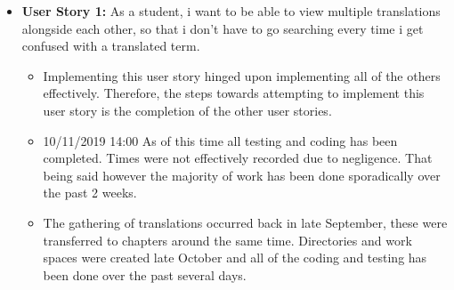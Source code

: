 \documentclass{article}
\begin{document}
\begin{itemize}
\item{\textbf{User Story 1:} As a student, i want to be able to view multiple  translations alongside each other, so that i don’t have to go searching every time i get confused with a translated term.}
\begin{itemize}
\item{Implementing this user story hinged upon implementing all of the others effectively. Therefore, the steps towards attempting to implement this user story is the completion of the other user stories.} 
\item{10/11/2019 14:00 As of this time all testing and coding has been completed. Times were not effectively recorded due to negligence. That being said however the majority of work has been done sporadically over the past 2 weeks.}
\item{The gathering of translations occurred back in late September, these were transferred to chapters around the same time. Directories and work spaces were created late October and all of the coding and testing has been done over the past several days.}
\end{itemize}


\end{itemize}
\end{document}
